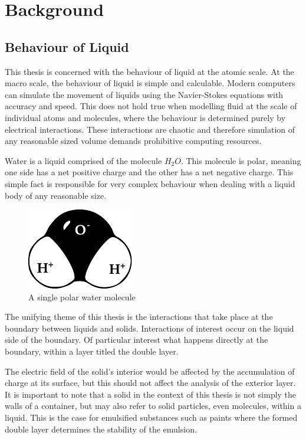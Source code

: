 
\section{Background}

  \subsection{Behaviour of Liquid}
    This thesis is concerned with the behaviour of liquid at the atomic scale.
    At the macro scale, the behaviour of liquid is simple and calculable.
    Modern computers can simulate the movement of liquids using the Navier-Stokes equations with accuracy and speed.
    This does not hold true when modelling fluid at the scale of individual atoms and molecules, where the behaviour is determined purely by electrical interactions.
    These interactions are chaotic and therefore simulation of any reasonable sized volume demands prohibitive computing resources.

    Water is a liquid comprised of the molecule $H_{2}O$.
    This molecule is polar, meaning one side has a net positive charge and the other has a net negative charge.
    This simple fact is responsible for very complex behaviour when dealing with a liquid body of any reasonable size.

    \begin{figure}
        \begin{center}
            \includegraphics{content/introduction/graphics/polarWater}
        \end{center}
        \caption{A single polar water molecule}
        \label{fig:waterMolecule}
    \end{figure}

    The unifying theme of this thesis is the interactions that take place at the boundary between liquids and solids.
    Interactions of interest occur on the liquid side of the boundary.
    Of particular interest what happens directly at the boundary, within a layer titled the double layer.

    The electric field of the solid's interior would be affected by the accumulation of charge at its surface, but this should not affect the analysis of the exterior layer.
    It is important to note that a solid in the context of this thesis is not simply the walls of a container, but may also refer to solid particles, even molecules, within a liquid.
    This is the case for emulsified substances such as paints where the formed double layer determines the stability of the emulsion.

